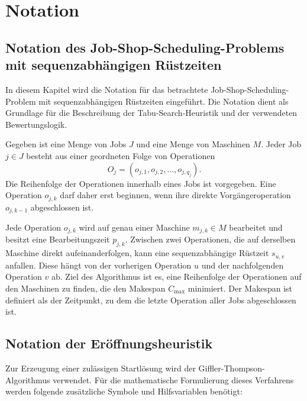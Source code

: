\chapter{Notation}
\label{chap:notation}

\section*{Notation des Job-Shop-Scheduling-Problems mit sequenzabhängigen Rüstzeiten}


In diesem Kapitel wird die Notation für das betrachtete Job-Shop-Scheduling-Problem mit sequenzabhängigen Rüstzeiten eingeführt. Die Notation dient als Grundlage für die Beschreibung der Tabu-Search-Heuristik und der verwendeten Bewertungslogik.

Gegeben ist eine Menge von Jobs \(J\) und eine Menge von Maschinen \(M\). Jeder Job \(j \in J\) besteht aus einer geordneten Folge von Operationen
\[
    O_j = (o_{j,1}, o_{j,2}, \dots, o_{j,q_j}).
\]
Die Reihenfolge der Operationen innerhalb eines Jobs ist vorgegeben. Eine Operation \(o_{j,k}\) darf daher erst beginnen, wenn ihre direkte Vorgängeroperation \(o_{j,k-1}\) abgeschlossen ist.

Jede Operation \(o_{j,k}\) wird auf genau einer Maschine \(m_{j,k} \in M\) bearbeitet und besitzt eine Bearbeitungszeit \(p_{j,k}\). Zwischen zwei Operationen, die auf derselben Maschine direkt aufeinanderfolgen, kann eine sequenzabhängige Rüstzeit \(s_{u,v}\) anfallen. Diese hängt von der vorherigen Operation \(u\) und der nachfolgenden Operation \(v\) ab. Ziel des Algorithmus ist es, eine Reihenfolge der Operationen auf den Maschinen zu finden, die den Makespan \(C_{\max}\) minimiert. Der Makespan ist definiert als der Zeitpunkt, zu dem die letzte Operation aller Jobs abgeschlossen ist.


\section*{Notation der Eröffnungsheuristik}

Zur Erzeugung einer zulässigen Startlösung wird der Giffler-Thompson-Algorithmus verwendet. Für die mathematische Formulierung dieses Verfahrens werden folgende zusätzliche Symbole und Hilfsvariablen benötigt:

